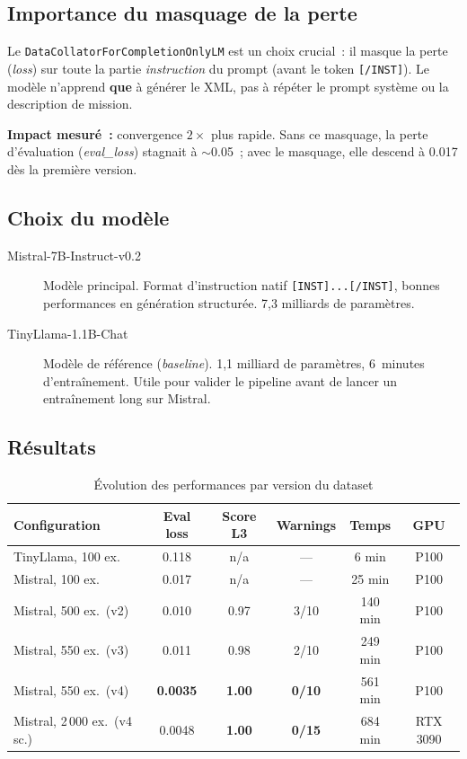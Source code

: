 \documentclass[a4paper,11pt]{article}
\begin{document}
\subsection{Importance du masquage de la perte}

Le \texttt{DataCollatorForCompletionOnlyLM} est un choix crucial~: il masque
la perte (\emph{loss}) sur toute la partie \emph{instruction} du prompt
(avant le token \texttt{[/INST]}). Le modèle n'apprend \textbf{que} à
générer le XML, pas à répéter le prompt système ou la description de mission.

\textbf{Impact mesuré~:} convergence $2\times$ plus rapide. Sans ce
masquage, la perte d'évaluation (\emph{eval\_loss}) stagnait à $\sim$0.05~;
avec le masquage, elle descend à 0.017 dès la première version.

\subsection{Choix du modèle}

\begin{description}
    \item[Mistral-7B-Instruct-v0.2] Modèle principal. Format d'instruction
    natif \texttt{[INST]...[/INST]}, bonnes performances en génération
    structurée. 7,3 milliards de paramètres.
    \item[TinyLlama-1.1B-Chat] Modèle de référence (\emph{baseline}).
    1,1 milliard de paramètres, 6~minutes d'entraînement. Utile pour valider
    le pipeline avant de lancer un entraînement long sur Mistral.
\end{description}

\subsection{Résultats}

\begin{table}[h]
\centering
\caption{Évolution des performances par version du dataset}
\label{tab:resultats}
\begin{tabular}{@{}l c c c c c@{}}
\toprule
\textbf{Configuration} & \textbf{Eval loss} & \textbf{Score L3} &
\textbf{Warnings} & \textbf{Temps} & \textbf{GPU} \\
\midrule
TinyLlama, 100 ex. & 0.118 & n/a & --- & 6 min & P100 \\
Mistral, 100 ex. & 0.017 & n/a & --- & 25 min & P100 \\
Mistral, 500 ex.\ (v2) & 0.010 & 0.97 & 3/10 & 140 min & P100 \\
Mistral, 550 ex.\ (v3) & 0.011 & 0.98 & 2/10 & 249 min & P100 \\
Mistral, 550 ex.\ (v4) & \textbf{0.0035} & \textbf{1.00} & \textbf{0/10}
& 561 min & P100 \\
Mistral, 2\,000 ex.\ (v4 sc.) & 0.0048 & \textbf{1.00} & \textbf{0/15}
& 684 min & RTX 3090 \\
\bottomrule
\end{tabular}
\end{table}
\end{document}
